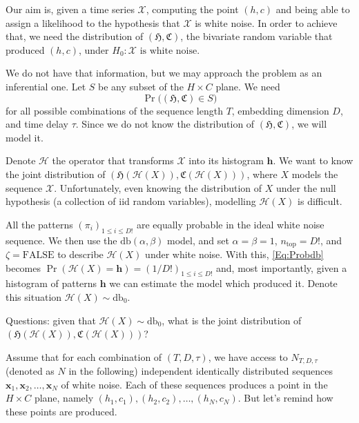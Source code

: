 \documentclass[12pt]{article}
\begin{document}
Our aim is, given a time series $\mathcal X$, computing the point $(h,c)$ and being able to assign a likelihood to the hypothesis that $\mathcal X$ is white noise.
In order to achieve that, we need the distribution of $(\mathfrak{H},\mathfrak{C})$, the bivariate random  variable that produced $(h,c)$, under $H_0:\mathcal X\text { is white noise}$.

We do not have that information, but we may approach the problem as an inferential one.
Let $S$ be any subset of the $H\times C$ plane.
We need 
\begin{equation}
\Pr\big((\mathfrak{H},\mathfrak{C})\in S\big)
\label{Eq:Problem}
\end{equation}
for all possible combinations of the sequence length $T$, embedding dimension $D$, and time delay $\tau$.
Since we do not know the distribution of $(\mathfrak{H},\mathfrak{C})$, we will model it.

Denote $\mathcal H$ the operator that transforms $\mathcal X$ into its histogram $\bm h$.
We want to know the joint distribution of $(\mathfrak{H}(\mathcal H(X)),\mathfrak{C}(\mathcal H(X)))$, where $X$ models the sequence $\mathcal X$.
Unfortunately, even knowing the distribution of $X$ under the null hypothesis (a collection of iid random variables), modelling $\mathcal H(X)$ is difficult.

All the patterns $(\pi_i)_{1\leq i\leq D!}$ are equally probable in the ideal white noise sequence.
We then use the $\text{db}(\alpha,\beta)$ model, and set $\alpha=\beta=1$, $n_{\text{top}}=D!$, and $\zeta=\text{FALSE}$ to describe $\mathcal H(X)$ under white noise.
With this, \eqref{Eq:Probdb} becomes $\Pr(\mathcal H(X)=\bm h)=(1/D!)_{1\leq i\leq D!}$ and, most importantly, given a histogram of patterns $\bm h$ we can estimate the model which produced it.
Denote this situation $\mathcal H(X)\sim\text{db}_0$.

Questions: given that $\mathcal H(X)\sim\text{db}_0$, what is the joint distribution of $(\mathfrak{H}(\mathcal H(X)),\mathfrak{C}(\mathcal H(X)))$?

Assume that for each combination of $(T,D,\tau)$, we have access to $N_{T,D,\tau}$ (denoted as $N$ in the following) independent identically distributed sequences $\bm x_1,\bm x_2, \dots, \bm x_N$ of white noise.
Each of these sequences produces a point in the $H\times C$ plane, namely $(h_1,c_1), (h_2,c_2), \dots , (h_N,c_N)$.
But let's remind how these points are produced.
\end{document}
